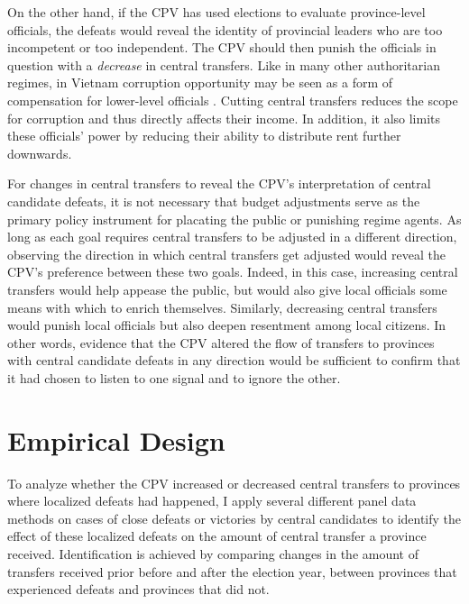 \documentclass[12pt]{article}
\newcommand{\1}{\mathbbm{1}}
\begin{document}
On the other hand, if the CPV has used elections to evaluate province-level officials, the defeats would reveal the identity of provincial leaders who are too incompetent or too independent. The CPV should then punish the officials in question with a \textit{decrease} in central transfers. Like in many other authoritarian regimes, in Vietnam corruption opportunity may be seen as a form of compensation for lower-level officials \citep{Darden2008}. Cutting central transfers reduces the scope for corruption and thus directly affects their income. In addition, it also limits these officials' power by reducing their ability to distribute rent further downwards.

For changes in central transfers to reveal the CPV's interpretation of central candidate defeats, it is not necessary that budget adjustments serve as the primary policy instrument for placating the public or punishing regime agents. As long as each goal requires central transfers to be adjusted in a different direction, observing the direction in which central transfers get adjusted would reveal the CPV's preference between these two goals. Indeed, in this case, increasing central transfers would help appease the public, but would also give local officials some means with which to enrich themselves. Similarly, decreasing central transfers would punish local officials but also deepen resentment among local citizens. In other words, evidence that the CPV altered the flow of transfers to provinces with central candidate defeats in any direction would be sufficient to confirm that it had chosen to listen to one signal and to ignore the other.

\section{Empirical Design}
\label{sec:methods}

To analyze whether the CPV increased or decreased central transfers to provinces where localized defeats had happened, I apply several different panel data methods on cases of close defeats or victories by central candidates to identify the effect of these localized defeats on the amount of central transfer a province received. Identification is achieved by comparing changes in the amount of transfers received prior before and after the election year, between provinces that experienced defeats and provinces that did not. 
\end{document}
